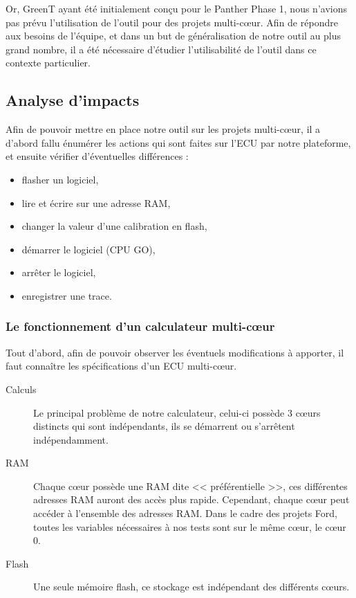 Or, GreenT ayant été initialement conçu pour le Panther Phase 1, nous n'avions pas prévu l'utilisation de l'outil pour des projets multi-cœur. Afin de répondre aux besoins de l'équipe, et dans un but de généralisation de notre outil au plus grand nombre, il a été nécessaire d'étudier l'utilisabilité de l'outil dans ce contexte particulier.

\subsection{Analyse d'impacts}\label{analyseimpact}
Afin de pouvoir mettre en place notre outil sur les projets multi-cœur, il a d'abord fallu énumérer les actions qui sont faites sur l'ECU par notre plateforme, et ensuite vérifier d'éventuelles différences : 
\begin{itemize}
	\item flasher un logiciel,
	\item lire et écrire sur une adresse RAM,
	\item changer la valeur d'une calibration en flash,
	\item démarrer le logiciel (CPU GO),
	\item arrêter le logiciel,
	\item enregistrer une trace.
\end{itemize}


\subsubsection{Le fonctionnement d'un calculateur multi-cœur}
Tout d'abord, afin de pouvoir observer les éventuels modifications à apporter, il faut connaître les spécifications d'un ECU multi-cœur. 
\begin{description}
	\item[Calculs] Le principal problème de notre calculateur, celui-ci possède 3 cœurs distincts qui sont indépendants, ils se démarrent ou s'arrêtent indépendamment. 
	\item[RAM] Chaque c\oe{}ur possède une RAM dite << préférentielle >>, ces différentes adresses RAM auront des accès plus rapide. Cependant, chaque cœur peut accéder à l'ensemble des adresses RAM. Dans le cadre des projets Ford, toutes les variables nécessaires à nos tests sont sur le même c\oe{}ur, le c\oe{}ur 0. 
	\item[Flash] Une seule mémoire flash, ce stockage est indépendant des différents c\oe{}urs. 
\end{description}

